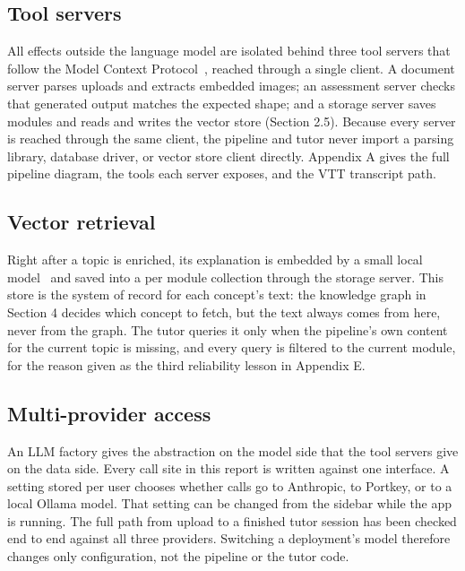 \documentclass{ecai}
\begin{document}
\subsection{Tool servers}

All effects outside the language model are isolated behind three tool servers
that follow the Model Context Protocol~\cite{anthropic2024mcp}, reached through a
single client. A document server parses uploads and extracts embedded images; an
assessment server checks that generated output matches the expected shape; and a
storage server saves modules and reads and writes the vector store (Section 2.5).
Because every server is reached through the same client, the pipeline and tutor
never import a parsing library, database driver, or vector store client directly.
Appendix A gives the full pipeline diagram, the tools each server exposes, and
the VTT transcript path.

\subsection{Vector retrieval}

Right after a topic is enriched, its explanation is embedded by a small local
model~\cite{reimers2019sentence} and saved into a per module collection through
the storage server. This store is the system of record for each concept's text:
the knowledge graph in Section 4 decides which concept to fetch, but the text
always comes from here, never from the graph. The tutor queries it only when the
pipeline's own content for the current topic is missing, and every query is
filtered to the current module, for the reason given as the third reliability
lesson in Appendix E.

\subsection{Multi-provider access}

An LLM factory gives the abstraction on the model side that the tool
servers give on the data side. Every call site in this report is written
against one interface. A setting stored per user chooses whether calls go to
Anthropic, to Portkey, or to a local Ollama model. That setting can be changed
from the sidebar while the app is running. The full path from upload to a
finished tutor session has been checked end to end against all three providers.
Switching a deployment's model therefore changes only configuration, not the
pipeline or the tutor code.
\end{document}
